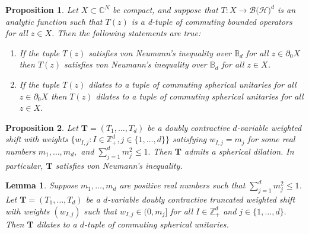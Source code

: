 \documentclass[10pt,a4paper]{amsart}
\newtheorem{lemma}{Lemma}
\newtheorem{proposition}{Proposition}
\begin{document}
\begin{proposition}\label{Arveson}
    Let \(X \subset\mathbb{C}^N  \) be compact, and suppose that \(T: X\to \mathcal{B}(\mathcal{H)}^d\) is an analytic function such that \(T(z)\) is a d-tuple of commuting bounded operators  for all \(z\in X\). Then the following statements are true: 
    \begin{enumerate}
        \item If the tuple \(T(z)\) satisfies  von Neumann's inequality over $\mathbb B_d$ for all \(z\in \partial_0 X\) then $T(z)$ satisfies von Neumann's inequality over $\mathbb B_d$ for all $z\in  X$.
        \item If the tuple \(T(z)\) dilates to a tuple of commuting spherical unitaries for all \(z\in \partial_0 X\) then $T(z)$ dilates to a tuple of commuting spherical unitaries for all $z\in X$.
    \end{enumerate}
\end{proposition}

\begin{proposition}\label{Dilation for X_0}
    Let $\boldsymbol T=(T_1, \ldots, T_d)$ be a doubly contractive $d$-variable weighted shift with weights $\{w_{I,j}: I\in\mathbb{Z}_+^d, j\in\{1,\ldots, d\}\}$ satisfying $w_{I,j}=m_j$ for some real numbers $m_1,\ldots,m_d,$ and $\sum_{j=1}^{d} m_j^2 \leq 1.$
Then $\boldsymbol T$ admits a spherical dilation. In particular, $\boldsymbol T$ satisfies von Neumann’s inequality.
\end{proposition}

\begin{lemma}\label{Sperical unitary dilation for truncated weighted shift}
Suppose $m_1,\ldots, m_d$ are positive real numbers such that \(\sum_{j=1}^d m_j^2 \leq1\).
Let $\boldsymbol T=(T_1,\ldots, T_d)$ be a \( d \)-variable doubly contractive truncated weighted shift with weights $(w_{I,j})$ such that \( w_{I,j}\in (0, m_j] \) for all $I\in\mathbb{Z}_+^d$ and $j\in\{1,\ldots, d\}.$ Then $\boldsymbol T$  dilates to a \( d \)-tuple of commuting spherical unitaries.
\end{lemma}
\end{document}
